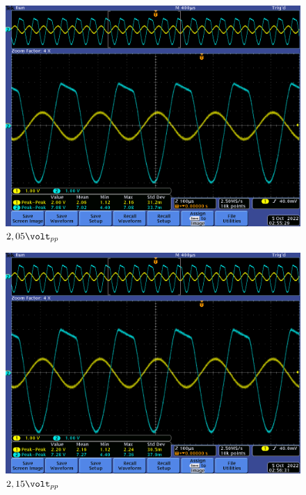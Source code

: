 \documentclass[12pt,letterpaper]{article}     %
\begin{document}
{\begin{figure}[!ht]
\centering
\includegraphics[scale=0.5]{imagenes/9.png}
\caption{$2,05\volt_{pp}$}
\label{fig:9}
\end{figure}

\begin{figure}[!ht]
\centering
\includegraphics[scale=0.5]{imagenes/10.png}
\caption{$2,15\volt_{pp}$}
\label{fig:10}
\end{figure}

}
\end{document}

